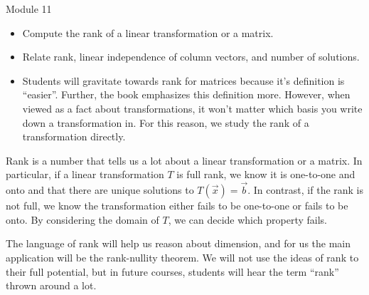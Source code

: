 \documentclass{workbook}
\begin{document}
\begin{lesson}

	Module 11

	\begin{itemize}
		\item Compute the rank of a linear transformation or a matrix.
		\item Relate rank, linear independence of column vectors, and number of solutions.
	\end{itemize}

	\begin{annotation}
		\begin{notes}
			\begin{itemize}
				\item Students will gravitate towards rank for matrices because it's definition
					is ``easier''. Further, the book emphasizes this definition more. However,
					when viewed as a fact about transformations, it won't matter which
					basis you write down a transformation in. For this reason, we study the
					rank of a transformation directly.
			\end{itemize}
		\end{notes}
	\end{annotation}
	Rank is a number that tells us a lot about a linear transformation or a matrix. In particular,
	if a linear transformation $T$ is full rank, we know it is one-to-one and onto and that there are unique
	solutions to $T(\vec x)=\vec b$. In contrast, if the rank is not full, we know the transformation either fails to be
	one-to-one or fails to be onto. By considering the domain of $T$, we can decide which property fails.

	The language of rank will help us reason about dimension, and for us the main application will be the
	rank-nullity theorem. We will not use the ideas of rank to their full potential, but in
	future courses, students will hear the term ``rank'' thrown around a lot.

\end{lesson}
\end{document}
